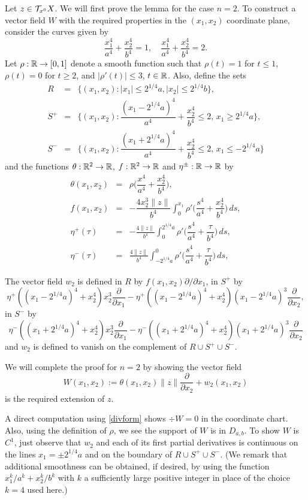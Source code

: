 \begin{pf}
Let $z \in {\cal T}_{x^0}X$.
We will first prove the lemma for the case  $n=2$.
To construct
a vector field $W$ with the required
properties in the $(x_1,x_2)$ coordinate plane, consider
the curves given by
\[
\dfrac{x^4_1}{a^4} + \dfrac{x^4_2}{b^4} =1,\quad
\dfrac{x^4_1}{a^4} + \dfrac{x^4_2}{b^4} = 2.
\]
Let $\rho:{\Bbb{R}} \to [0,1]$ denote a smooth function
such that $\rho(t)=1$
for $t\le 1$,
$\rho(t)=0$ for $t\ge 2$, and
$|\rho'(t) | \le 3$, $t\in {\Bbb{R}}$.
Also, define the sets
\begin{eqnarray*}
R&=&\{(x_1, x_2): |x_1| \le
2^{1/4}a, |x_2| \le 2^{1/4}b\}, \\
S^+&=&\{(x_1, x_2):
\dfrac{(x_1-2^{1/4}a)^4}{a^4} +
  \dfrac{x^4_2}{b^4}\le 2,\,x_1\ge 2^{1/4}a\}, \\
S^-&=&\{(x_1, x_2):
\dfrac{(x_1+2^{1/4}a)^4}{a^4} +
  \dfrac{x^4_2}{b^4}\le 2,\,x_1\le -2^{1/4}a\}
\end{eqnarray*}
and the functions $\theta:{\Bbb{R}}^2\to {\Bbb{R}}$, $f:{\Bbb{R}}^2\to {\Bbb{R}}$ and
$\eta^\pm:{\Bbb{R}}\to{\Bbb{R}}$ by
\begin{eqnarray*}
\theta(x_1, x_2) &=& \rho \big(\dfrac{x^4}{a^4} +
\dfrac{x^4_2}{b^4}\big),         \\
f(x_1,x_2) &=&- \dfrac{4x^3_2
\|z\|}{b^4} \int^{x_1}_0 \rho'
\bigg(\dfrac{s^4}{a^4} + \dfrac{x^4_2}{b^4}\bigg)\,ds, \\
\eta^+(\tau)&=&-\frac{4\| z\|}{b^4} \int^{2^{1/4}a}_0 \rho'
\bigg(\dfrac{s^4}{a^4} + \dfrac{\tau}{b^4}\bigg)\,ds, \\
\eta^-(\tau)&=&\frac{4\| z\|}{b^4} \int^0_{-2^{1/4}a}\rho'
\bigg(\dfrac{s^4}{a^4} + \dfrac{\tau}{b^4}\bigg)\,ds,
\end{eqnarray*}

The vector field $w_2$ is defined in $R$ by
$f(x_1,x_2)\partial/\partial x_1$,
in $S^+$ by
\[
 \eta^+((x_1-2^{1/4}a)^4+x_2^4)x_2^3\frac{\partial}{\partial x_1}
-\eta^+((x_1-2^{1/4}a)^4+x_2^4)(x_1-2^{1/4}a)^3\frac{\partial}{\partial x_2},
\]
in $S^-$ by
\[
 \eta^-((x_1+2^{1/4}a)^4+x_2^4)x_2^3
   \frac{\partial}{\partial x_1}
-\eta^-((x_1+2^{1/4}a)^4+x_2^4)(x_1+2^{1/4}a)^3
   \frac{\partial}{\partial x_2}
\]
and $w_2$ is defined to vanish on the complement of $R\cup S^+\cup S^-$.

We will complete the proof for $n=2$ by showing  the vector field
\[
W(x_1,x_2):=
\theta(x_1,x_2)\|z\|\frac{\partial}{\partial x_2}+w_2(x_1,x_2)
\]
is the required extension of $z$.

A direct computation using \eqref{divform} shows $\div W=0$ in the
coordinate chart. Also, using the definition of $\rho$, we see
the support of $W$ is in $D_{a,b}$. To show $W$ is $C^1$, just observe
that $w_2$ and each of its
first partial derivatives
is continuous on the lines
$x_1=\pm 2^{1/4}a$ and on the boundary of $R\cup S^+\cup S^-$.
(We remark that additional smoothness can be obtained, if desired,
by using the function  $x_1^k/a^k+x_2^k/b^k$ with $k$ a sufficiently
large positive integer in place of the choice $k=4$ used here.)


\end{pf}
